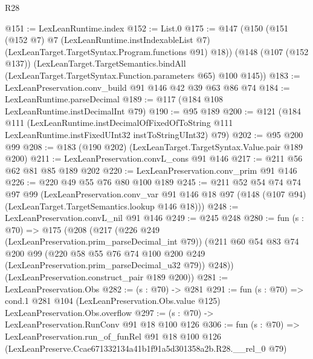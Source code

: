 \begin{lexlean}{R28}
\begin{coremodule}
@151 := LexLeanRuntime.index
@152 := List.{0}
@175 := @147
    (@150
      (@151
        (@152 @7)
        @7
        (LexLeanRuntime.instIndexableList @7)
        (LexLeanTarget.TargetSyntax.Program.functions @91)
        @18))
    (@148
      (@107 (@152 @137))
      (LexLeanTarget.TargetSemantics.bindAll
        (LexLeanTarget.TargetSyntax.Function.parameters @65)
        @100
        @145))
@183 := LexLeanPreservation.conv_build @91 @146 @42 @39 @63 @86 @74
@184 := LexLeanRuntime.parseDecimal
@189 := @117 (@184 @108 LexLeanRuntime.instDecimalInt @79)
@190 := @95 @189
@200 := @121
    (@184
      @111
      (LexLeanRuntime.instDecimalOfFixedOfToString
        @111
        LexLeanRuntime.instFixedUInt32
        instToStringUInt32)
      @79)
@202 := @95 @200 @99
@208 := @183 (@190 @202) (LexLeanTarget.TargetSyntax.Value.pair @189 @200)
@211 := LexLeanPreservation.convL_cons @91 @146
@217 := @211 @56 @62 @81 @85 @189 @202
@220 := LexLeanPreservation.conv_prim @91 @146
@226 := @220 @49 @55 @76 @80 @100 @189
@245 := @211
    @52
    @54
    @74
    @74
    @97
    @99
    (LexLeanPreservation.conv_var
      @91
      @146
      @18
      @97
      (@148 (@107 @94) (LexLeanTarget.TargetSemantics.lookup @146 @18)))
@248 := LexLeanPreservation.convL_nil @91 @146
@249 := @245 @248
@280 := fun (s : @70) =>
  @175
    (@208
      (@217
        (@226 @249 (LexLeanPreservation.prim_parseDecimal_int @79))
        (@211
          @60
          @54
          @83
          @74
          @200
          @99
          (@220 @58 @55 @76 @74 @100 @200 @249 (LexLeanPreservation.prim_parseDecimal_u32 @79))
          @248))
      (LexLeanPreservation.construct_pair @189 @200))
@281 := LexLeanPreservation.Obs
@282 := (s : @70) -> @281
@291 := fun (s : @70) =>
  cond.{1} @281 @104 (LexLeanPreservation.Obs.value @125) LexLeanPreservation.Obs.overflow
@297 := (s : @70) -> LexLeanPreservation.RunConv @91 @18 @100 @126
@306 := fun (s : @70) =>
  LexLeanPreservation.run_of_funRel
    @91
    @18
    @100
    @126
    (LexLeanPreserve.Ccae671332134a41b1f91a5d301358a2b.R28.__rel_0 @79)
\end{coremodule}
\end{lexlean}
